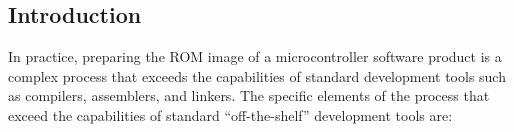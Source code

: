 
\chapter{\cdaazerolongtitle{}}

\label{cdaa0}


\section{Introduction}

In practice, preparing the ROM image of a microcontroller software product
is a complex process that exceeds the capabilities of standard development
tools such as compilers, assemblers, and linkers.  The specific 
elements of the process that exceed the capabilities of standard ``off-the-shelf''
development tools are:

